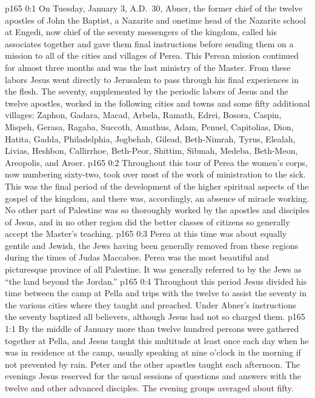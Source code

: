 \author{Midwayer Commission}
\vs p165 0:1 On Tuesday, January 3, A.D.~30, Abner, the former chief of the twelve apostles of John the Baptist, a Nazarite and onetime head of the Nazarite school at Engedi, now chief of the seventy messengers of the kingdom, called his associates together and gave them final instructions before sending them on a mission to all of the cities and villages of Perea. This Perean mission continued for almost three months and was the last ministry of the Master. From these labors Jesus went directly to Jerusalem to pass through his final experiences in the flesh. The seventy, supplemented by the periodic labors of Jesus and the twelve apostles, worked in the following cities and towns and some fifty additional villages: Zaphon, Gadara, Macad, Arbela, Ramath, Edrei, Bosora, Caspin, Mispeh, Gerasa, Ragaba, Succoth, Amathus, Adam, Penuel, Capitolias, Dion, Hatita, Gadda, Philadelphia, Jogbehah, Gilead, Beth\hyp{}Nimrah, Tyrus, Elealah, Livias, Heshbon, Callirrhoe, Beth\hyp{}Peor, Shittim, Sibmah, Medeba, Beth\hyp{}Meon, Areopolis, and Aroer.
\vs p165 0:2 Throughout this tour of Perea the women’s corps, now numbering sixty\hyp{}two, took over most of the work of ministration to the sick. This was the final period of the development of the higher spiritual aspects of the gospel of the kingdom, and there was, accordingly, an absence of miracle working. No other part of Palestine was so thoroughly worked by the apostles and disciples of Jesus, and in no other region did the better classes of citizens so generally accept the Master’s teaching.
\vs p165 0:3 Perea at this time was about equally gentile and Jewish, the Jews having been generally removed from these regions during the times of Judas Maccabee. Perea was the most beautiful and picturesque province of all Palestine. It was generally referred to by the Jews as “the land beyond the Jordan.”
\vs p165 0:4 Throughout this period Jesus divided his time between the camp at Pella and trips with the twelve to assist the seventy in the various cities where they taught and preached. Under Abner’s instructions the seventy baptized all believers, although Jesus had not so charged them.
\vs p165 1:1 By the middle of January more than twelve hundred persons were gathered together at Pella, and Jesus taught this multitude at least once each day when he was in residence at the camp, usually speaking at nine o’clock in the morning if not prevented by rain. Peter and the other apostles taught each afternoon. The evenings Jesus reserved for the usual sessions of questions and answers with the twelve and other advanced disciples. The evening groups averaged about fifty.
